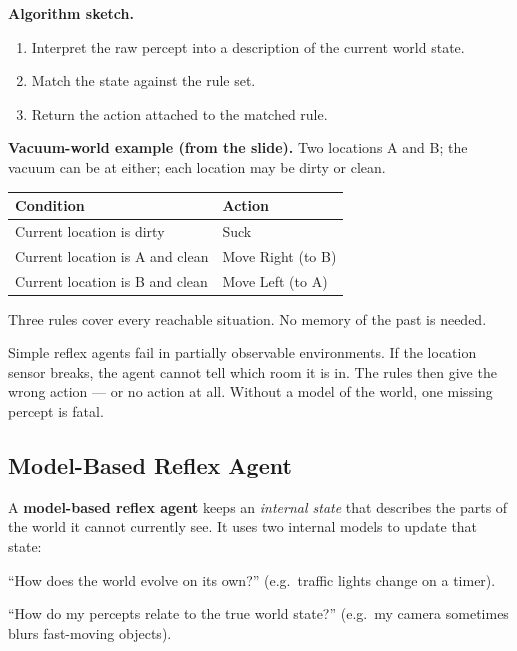 \documentclass[a4paper,11pt]{article}
\newcommand{\vocab}[1]{\textbf{\color{navy}#1}}
\begin{document}
\textbf{Algorithm sketch.}
\begin{enumerate}
  \item Interpret the raw percept into a description of the current world state.
  \item Match the state against the rule set.
  \item Return the action attached to the matched rule.
\end{enumerate}

\textbf{Vacuum-world example (from the slide).} Two locations A and B; the
vacuum can be at either; each location may be dirty or clean.
\begin{center}\small
\begin{tabular}{@{}ll@{}}
\toprule
\textbf{Condition} & \textbf{Action} \\
\midrule
Current location is dirty & Suck \\
Current location is A and clean & Move Right (to B) \\
Current location is B and clean & Move Left (to A) \\
\bottomrule
\end{tabular}
\end{center}
Three rules cover every reachable situation. No memory of the past is needed.

\begin{watchout}
Simple reflex agents fail in partially observable environments.
If the location sensor breaks, the agent cannot tell which room it is in.
The rules then give the wrong action --- or no action at all.
Without a model of the world, one missing percept is fatal.
\end{watchout}

\subsection{Model-Based Reflex Agent}

A \vocab{model-based reflex agent} keeps an \emph{internal state} that describes
the parts of the world it cannot currently see. It uses two internal models to
update that state:

\begin{description}[leftmargin=7em,style=nextline,font=\normalfont\bfseries\color{navy}]
  \item[Transition model] ``How does the world evolve on its own?'' (e.g.\ traffic
    lights change on a timer).
  \item[Sensor model] ``How do my percepts relate to the true world state?''
    (e.g.\ my camera sometimes blurs fast-moving objects).
\end{description}
\end{document}
